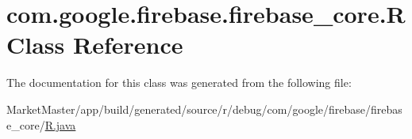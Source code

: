 \hypertarget{classcom_1_1google_1_1firebase_1_1firebase__core_1_1R}{}\section{com.\+google.\+firebase.\+firebase\+\_\+core.\+R Class Reference}
\label{classcom_1_1google_1_1firebase_1_1firebase__core_1_1R}


The documentation for this class was generated from the following file\+:\begin{DoxyCompactItemize}
\item 
Market\+Master/app/build/generated/source/r/debug/com/google/firebase/firebase\+\_\+core/\mbox{\hyperlink{debug_2com_2google_2firebase_2firebase__core_2R_8java}{R.\+java}}\end{DoxyCompactItemize}
